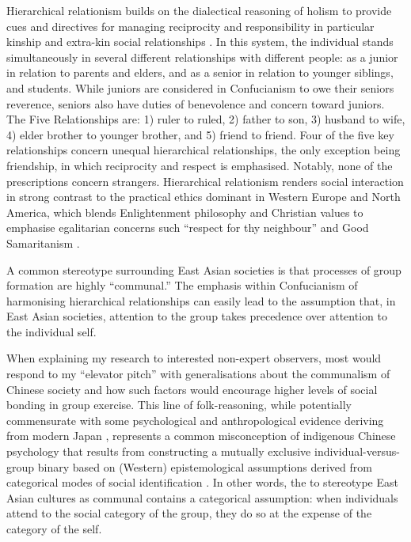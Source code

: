 \begin{CJK}{UTF8}{gbsn}
Hierarchical relationism builds on the dialectical reasoning of holism to provide cues and directives for managing reciprocity and responsibility in particular kinship and extra-kin social relationships \citep[\textit{renqing} 人情][]{Maehr1980}.   In this system, the individual stands simultaneously in several different relationships with different people: as a junior in relation to parents and elders, and as a senior in relation to younger siblings, and students. While juniors are considered in Confucianism to owe their seniors reverence, seniors also have duties of benevolence and concern toward juniors. The Five Relationships are: 1) ruler to ruled, 2) father to son, 3) husband to wife, 4) elder brother to younger brother, and 5) friend to friend. Four of the five key relationships concern unequal hierarchical relationships, the only exception being friendship, in which reciprocity and respect is emphasised.  Notably, none of the prescriptions concern strangers.  Hierarchical relationism renders social interaction in strong contrast to the practical ethics dominant in Western Europe and North America, which blends Enlightenment philosophy and Christian values to emphasise egalitarian concerns such ``respect for thy neighbour'' and Good Samaritanism \citep{Liu2005}.

A common stereotype surrounding East Asian societies is that processes of group formation are highly ``communal.''  The emphasis within Confucianism of harmonising hierarchical relationships can easily lead to the assumption that, in East Asian societies, attention to the group takes precedence over attention to the individual self.

When explaining my research to interested non-expert observers, most would respond to my ``elevator pitch'' with generalisations about the communalism of Chinese society and how such factors would encourage higher levels of social bonding in group exercise.  This line of folk-reasoning, while potentially commensurate with some psychological and anthropological evidence deriving from modern Japan \citep{Kitayama2010b}, represents a common misconception of indigenous Chinese psychology that results from constructing a mutually exclusive individual-versus-group binary based on (Western) epistemological assumptions derived from categorical modes of social identification \citep{Tu1998}.  In other words, the to stereotype East Asian cultures as communal contains a categorical assumption: when individuals attend to the social category of the group, they do so at the expense of the category of the self.


\end{CJK}
